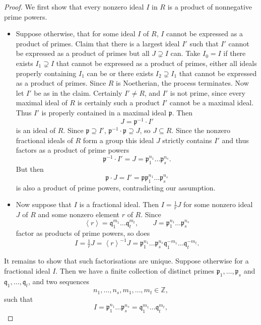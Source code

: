 \documentclass{article}
\newcommand{\Z}{\mathbb{Z}}
\newcommand{\ab}[1]{\left\langle #1 \right\rangle}
\theoremstyle{definition}\newtheorem{definition}{Definition}[subsection]
\theoremstyle{definition}\newtheorem{remark}[definition]{Remark}
\theoremstyle{definition}\newtheorem*{example}{Example}
\theoremstyle{definition}\newtheorem*{note}{Note}
\begin{document}
\begin{proof}
We first show that every nonzero ideal $ I $ in $ R $ is a product of nonnegative prime powers.
\begin{itemize}
\item Suppose otherwise, that for some ideal $ I $ of $ R $, $ I $ cannot be expressed as a product of primes. Claim that there is a largest ideal $ I' $ such that $ I' $ cannot be expressed as a product of primes but all $ J \supsetneq I $ can. Take $ I_0 = I $ if there exists $ I_1 \supsetneq I $ that cannot be expressed as a product of primes, either all ideals properly containing $ I_1 $ can be or there exists $ I_2 \supsetneq I_1 $ that cannot be expressed as a product of primes. Since $ R $ is Noetherian, the process terminates. Now let $ I' $ be as in the claim. Certainly $ I' \ne R $, and $ I' $ is not prime, since every maximal ideal of $ R $ is certainly such a product $ I' $ cannot be a maximal ideal. Thus $ I' $ is properly contained in a maximal ideal $ \mathfrak{p} $. Then
$$ J = \mathfrak{p}^{-1} \cdot I' $$
is an ideal of $ R $. Since $ \mathfrak{p} \supseteq I' $, $ \mathfrak{p}^{-1} \cdot \mathfrak{p} \supseteq J $, so $ J \subseteq R $. Since the nonzero fractional ideals of $ R $ form a group this ideal $ J $ strictly contains $ I' $ and thus factors as a product of prime powers
$$ \mathfrak{p}^{-1} \cdot I' = J = \mathfrak{p}_1^{n_1} \dots \mathfrak{p}_s^{n_s}. $$
But then
$$ \mathfrak{p} \cdot J = I' = \mathfrak{p}\mathfrak{p}_1^{n_1} \dots \mathfrak{p}_s^{n_s} $$
is also a product of prime powers, contradicting our assumption.
\item Now suppose that $ I $ is a fractional ideal. Then $ I = \tfrac{1}{r}J $ for some nonzero ideal $ J $ of $ R $ and some nonzero element $ r $ of $ R $. Since
$$ \ab{r} = \mathfrak{q}_1^{m_1} \dots \mathfrak{q}_t^{m_t}, \qquad J = \mathfrak{p}_1^{n_1} \dots \mathfrak{p}_s^{n_s} $$
factor as products of prime powers, so does
$$ I = \tfrac{1}{r}J = \ab{r}^{-1}J = \mathfrak{p}_1^{n_1} \dots \mathfrak{p}_s^{n_s}\mathfrak{q}_1^{-m_1} \dots \mathfrak{q}_t^{-m_t}. $$
\end{itemize}
It remains to show that such factorisations are unique. Suppose otherwise for a fractional ideal $ I $. Then we have a finite collection of distinct primes $ \mathfrak{p}_1, \dots, \mathfrak{p}_s $ and $ \mathfrak{q}_1, \dots, \mathfrak{q}_t $, and two sequences
$$ n_1, \dots, n_s, m_1, \dots, m_t \in \Z, $$
such that
$$ I = \mathfrak{p}_1^{n_1} \dots \mathfrak{p}_s^{n_s} = \mathfrak{q}_1^{m_1} \dots \mathfrak{q}_t^{m_t}, $$

\end{proof}
\end{document}
